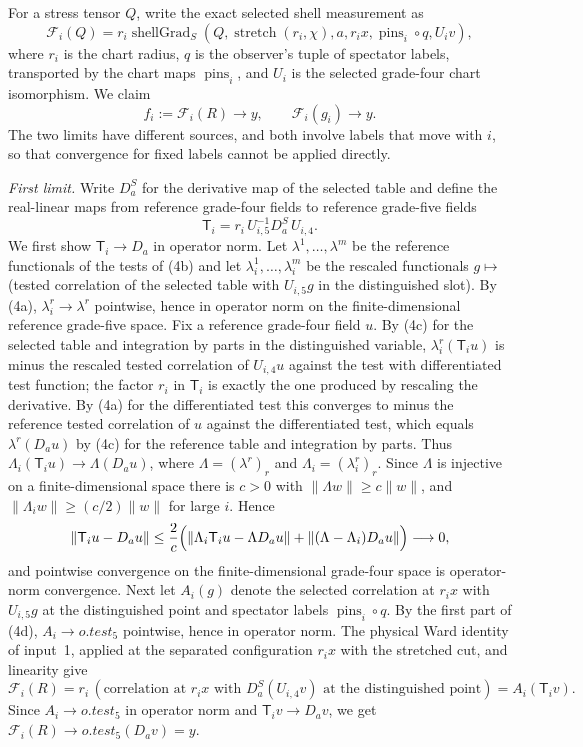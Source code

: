 For a stress tensor $Q$, write the exact selected shell measurement as
\[
 \mathscr F_i(Q)=r_i\operatorname{shellGrad}_S\!\left(
 Q,\operatorname{stretch}(r_i,\chi),a,r_i x,
 \operatorname{pins}_i\circ q,U_i v\right),
\]
where $r_i$ is the chart radius, $q$ is the observer's tuple of spectator
labels, transported by the chart maps $\operatorname{pins}_i$,
and $U_i$ is the selected grade-four chart isomorphism. We claim
\begin{equation}
 f_i:=\mathscr F_i(R)\to y,
 \qquad \mathscr F_i(g_i)\to y.
 \label{eq:ex-lattice-scribe-common-test}
\end{equation}
The two limits have different sources, and both involve labels that
move with $i$, so that convergence for fixed labels cannot be applied
directly.

\emph{First limit.} Write $D_a^S$ for the derivative map of the selected
table and define the real-linear maps from reference grade-four fields to
reference grade-five fields
\[
 \mathsf T_i=r_i\,U_{i,5}^{-1}D_a^S\,U_{i,4}.
\]
We first show $\mathsf T_i\to D_a$ in operator norm. Let
$\lambda^1,\ldots,\lambda^m$ be the reference functionals of the tests
of (4b) and let $\lambda^1_i,\ldots,\lambda^m_i$ be the rescaled
functionals $g\mapsto$ (tested correlation of the selected table with
$U_{i,5}g$ in the distinguished slot). By (4a), $\lambda^r_i\to\lambda^r$
pointwise, hence in operator norm on the finite-dimensional reference
grade-five space. Fix a reference grade-four field $u$. By (4c) for the
selected table and integration by parts in the distinguished variable,
$\lambda^r_i(\mathsf T_iu)$ is minus the rescaled tested correlation of
$U_{i,4}u$ against the test with differentiated test function; the factor
$r_i$ in $\mathsf T_i$ is exactly the one produced by rescaling the
derivative. By (4a) for the differentiated test this converges to minus
the reference tested correlation of $u$ against the differentiated test,
which equals $\lambda^r(D_au)$ by (4c) for the reference table and
integration by parts. Thus $\Lambda_i(\mathsf T_iu)\to\Lambda(D_au)$,
where $\Lambda=(\lambda^r)_r$ and $\Lambda_i=(\lambda^r_i)_r$. Since
$\Lambda$ is injective on a finite-dimensional space there is $c>0$ with
$\|\Lambda w\|\ge c\|w\|$, and $\|\Lambda_iw\|\ge(c/2)\|w\|$ for large
$i$. Hence
\[
 \|\mathsf T_iu-D_au\|\le\frac2c\Bigl(
 \|\Lambda_i\mathsf T_iu-\Lambda D_au\|
 +\|(\Lambda-\Lambda_i)D_au\|\Bigr)\longrightarrow0,
\]
and pointwise convergence on the finite-dimensional grade-four space is
operator-norm convergence. Next let $A_i(g)$ denote the selected
correlation at $r_ix$ with $U_{i,5}g$ at the distinguished point and
spectator labels $\operatorname{pins}_i\circ q$. By the first part of
(4d), $A_i\to o.test_5$ pointwise, hence in operator norm. The physical
Ward identity of input~1, applied at the separated configuration $r_ix$
with the stretched cut, and linearity give
\[
 \mathscr F_i(R)=r_i\,(\text{correlation at }r_ix\text{ with }
 D_a^S(U_{i,4}v)\text{ at the distinguished point})
 =A_i(\mathsf T_iv).
\]
Since $A_i\to o.test_5$ in operator norm and
$\mathsf T_iv\to D_av$, we get
$\mathscr F_i(R)\to o.test_5(D_av)=y$.

